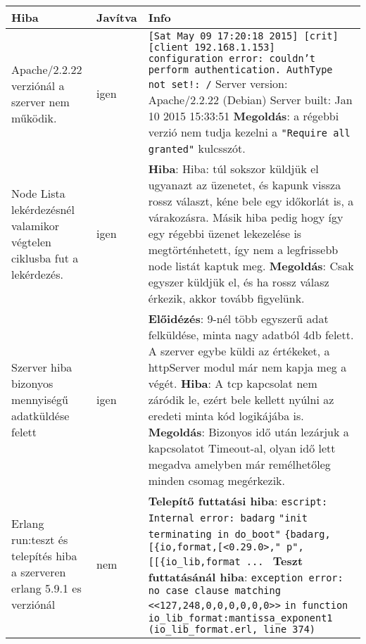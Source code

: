   \begin{center}\begin{tabular}{| p{4cm} | p{1.5cm} | p{8cm} |}
  \hline Hiba & Javítva & Info
    \\ \hline
      	Apache/2.2.22 verziónál a szerver nem működik. 
      &
      	igen
      &
		\texttt{[Sat May 09 17:20:18 2015] [crit] [client 192.168.1.153] configuration error:  couldn't perform authentication. AuthType not set!: /}\newline
		Server version: Apache/2.2.22 (Debian)
		Server built:   Jan 10 2015 15:33:51 
		\newline\textbf{Megoldás}:
		a régebbi verzió nem tudja kezelni a \texttt{"Require all granted"} kulcsszót.
	\\ \hline
        Node Lista lekérdezésnél valamikor végtelen ciklusba fut a lekérdezés. 
      &
      	igen
      &
      	\textbf{Hiba}:
		Hiba: túl sokszor küldjük el ugyanazt az üzenetet, és kapunk vissza rossz választ, kéne bele egy időkorlát is, a várakozásra. Másik hiba pedig hogy így egy régebbi üzenet lekezelése is megtörténhetett, így nem a legfrissebb node listát kaptuk meg. 
		\newline 
		\textbf{Megoldás}: Csak egyszer küldjük el, és ha rossz válasz érkezik, akkor tovább figyelünk.
  	\\ \hline
    	Szerver hiba bizonyos mennyiségű adatküldése felett 
      &
    	igen
      &  
    	\textbf{Előidézés}: 9-nél több egyszerű adat felküldése, minta nagy adatból 4db felett.
    	A szerver egybe küldi az értékeket, a httpServer modul már nem kapja meg a végét.
    	\textbf{Hiba}: A tcp kapcsolat nem záródik le, ezért bele kellett nyúlni az eredeti minta kód logikájába is.\newline
    	\textbf{Megoldás}: Bizonyos idő után lezárjuk a kapcsolatot Timeout-al, olyan idő lett megadva amelyben már remélhetőleg minden csomag megérkezik.
    \\ \hline
    	Erlang run:teszt és telepítés hiba a szerveren erlang 5.9.1 es verziónál
      &
      	nem
      &
      	\textbf{Telepítő futtatási hiba}: \newline
      	\texttt{escript: Internal error: badarg}
		\texttt{"init terminating in do\_boot"}
        \texttt{\{badarg,[\{io,format,[<0.29.0>,"~p",}
        \texttt{[[\{io\_lib,format ... }
		\newline \textbf{Teszt futtatásánál hiba}: \newline
		\texttt{exception error: no case clause matching <<127,248,0,0,0,0,0,0>>}
     	\texttt{in function  io\_lib\_format:mantissa\_exponent\/1}
     	\texttt{(io\_lib\_format.erl, line 374) }
    \\ \hline
	\end{tabular}\end{center}

